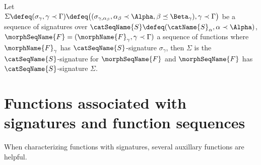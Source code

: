 \documentclass{article}
\begin{document}
\begin{definition}
Let \\
$\Sigma \defeq (\sigma_\gamma, \gamma \prec \Gamma) \defeq
\bigl ( (\sigma_{\gamma,{\alpha_\beta}},
\alpha_\beta \prec \Alpha,
\beta \preceq \Beta_\gamma), \gamma \prec \Gamma \bigr )$
be a sequence of signatures over
$\catSeqName{S} \defeq (\catName{S}_\alpha, \alpha \prec \Alpha)$,
$\morphSeqName{F}=(\morphName{F}_\gamma, \gamma \prec \Gamma)$
a sequence of functions where $\morphName{F}_\gamma$ has
$\catSeqName{S}$-signature $\sigma_\gamma$,
then $\Sigma$ is the
$\catSeqName{S}$-signature for $\morphSeqName{F}$ and
$\morphSeqName{F}$ has $\catSeqName{S}$-signature $\Sigma$.
\end{definition}

\section{Functions associated with signatures and function sequences}
\label{sec:sig}
When characterizing functions with signatures, several auxillary
functions are helpful.
\end{document}
